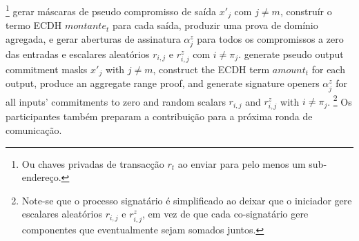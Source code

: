 \begin{enumerate}
\begin{enumerate}
\footnote{Ou chaves privadas de transacção $r_{t}$ ao enviar para pelo menos um sub-endereço.}
gerar máscaras de pseudo compromisso de saída $x'_{j}$ com $j \neq m$, construír o termo ECDH $\mathit{montante}_t$ para cada saída, produzir uma prova de domínio agregada, e gerar aberturas de assinatura $\alpha^z_j$ para todos os compromissos a zero das entradas e escalares aleatórios $r_{i,j}$ e $r^z_{i,j}$ com $i \neq \pi_j$.
generate pseudo output commitment masks $x'_{j}$ with $j \neq m$, construct the ECDH term $\mathit{amount}_t$ for each output, produce an aggregate range proof, and generate signature openers $\alpha^z_j$ for all inputs' commitments to zero and random scalars $r_{i,j}$ and $r^z_{i,j}$ with $i \neq \pi_j$.
\footnote{Note-se que o processo signatário é simplificado ao deixar que o iniciador gere escalares aleatórios $r_{i,j}$ e $r^z_{i,j}$, em vez de que cada co-signatário gere componentes que eventualmente sejam somados juntos.} 
Os participantes também preparam a contribuição para a próxima ronda de comunicação.\\


\end{enumerate}
\end{enumerate}
